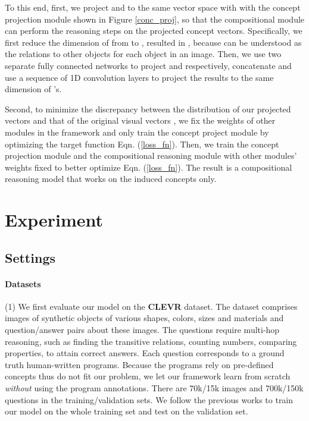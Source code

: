 \documentclass[10pt,twocolumn,letterpaper]{article}
\begin{document}
%
 
To this end, first, we project  and  to the same vector space with  with the concept projection module shown in Figure \ref{conc_proj}, so that the compositional module can perform the reasoning steps on the projected concept vectors.
Specifically, we first reduce the dimension of  from  to , resulted in , because  can be understood as the relations to other objects for each object in an image. Then, we use two separate fully connected networks to project  and  respectively, concatenate and use a sequence of 1D convolution layers to project the results to the same dimension of 's. 

Second, to minimize the discrepancy between the distribution of our projected vectors and that of the original visual vectors , we fix the weights of other modules in the framework and only train the concept project module by optimizing the target function Eqn. (\ref{loss_fn}). Then, we train the concept projection module and the compositional reasoning module with other modules' weights fixed to better optimize Eqn. (\ref{loss_fn}). The result is a compositional reasoning model that works on the induced concepts only. 


\vspace{-3mm}
\section{Experiment}
\vspace{-2mm}
\subsection{Settings}
\vspace{-2mm}
\paragraph{Datasets}
(1) We first evaluate our model on the \textbf{CLEVR} \cite{johnson2017clevr} dataset. The dataset comprises images of synthetic objects of various shapes, colors, sizes and materials and question/answer pairs about these images. The questions require multi-hop reasoning, such as finding the transitive relations, counting numbers, comparing properties, to attain correct answers. 
Each question corresponds to a ground truth human-written programs.
Because the programs rely on pre-defined concepts thus do not fit our problem, we let our framework learn from scratch \emph{without} using the program annotations.
There are 70k/15k images and 700k/150k questions in the training/validation sets. We follow the previous works \cite{yi2018neural,hudson2018compositional,mao2018neuro} to train our model on the whole training set and test on the validation set. 
\end{document}
